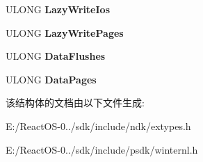\begin{DoxyCompactItemize}
U\+L\+O\+NG {\bfseries Lazy\+Write\+Ios}
\item 
\mbox{\label{struct___s_y_s_t_e_m___p_e_r_f_o_r_m_a_n_c_e___i_n_f_o_r_m_a_t_i_o_n_a3ca979baceda72d4ffe6fd303a0d3c85}} 
U\+L\+O\+NG {\bfseries Lazy\+Write\+Pages}
\item 
\mbox{\label{struct___s_y_s_t_e_m___p_e_r_f_o_r_m_a_n_c_e___i_n_f_o_r_m_a_t_i_o_n_aafeeb2af48be754e8e67fc8238387160}} 
U\+L\+O\+NG {\bfseries Data\+Flushes}
\item 
\mbox{\label{struct___s_y_s_t_e_m___p_e_r_f_o_r_m_a_n_c_e___i_n_f_o_r_m_a_t_i_o_n_a00ff81303bd9b2fc4d5521337e2cd986}} 
U\+L\+O\+NG {\bfseries Data\+Pages}
\end{DoxyCompactItemize}


该结构体的文档由以下文件生成\+:\begin{DoxyCompactItemize}
\item 
E\+:/\+React\+O\+S-\/0../sdk/include/ndk/extypes.\+h\item 
E\+:/\+React\+O\+S-\/0../sdk/include/psdk/winternl.\+h\end{DoxyCompactItemize}
